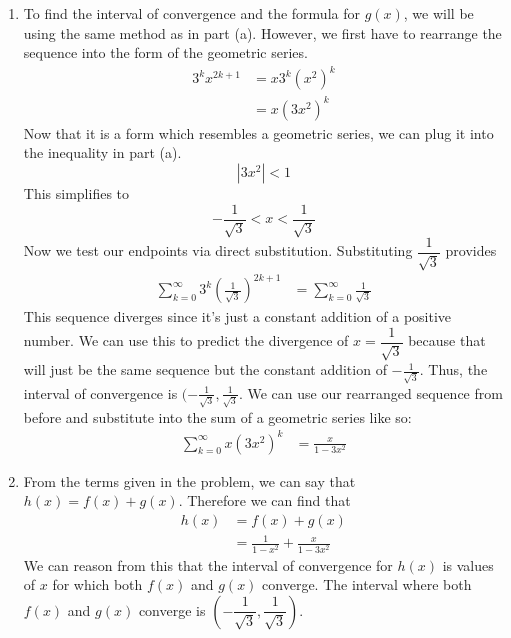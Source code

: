 \documentclass{article}
\begin{document}
\begin{enumerate}[label=\textbf{(13.\arabic*)}]
\begin{enumerate}
\item To find the interval of convergence and the formula for $g(x)$, we will be using the  same method as in part (a). However, we first have to rearrange the sequence into the form of the geometric series.
\begin{align*}
3^kx^{2k+1} &= x3^k\left(x^2\right)^k\\
&= x\left(3x^2\right)^k
\end{align*}
Now that it is a form which resembles a geometric series, we can plug it into the inequality in part (a).
\[\left|3x^2\right|<1\]
This simplifies to
\[-\frac{1}{\sqrt{3}}<x<\frac{1}{\sqrt{3}}\]
Now we test our endpoints via direct substitution. Substituting $\dfrac{1}{\sqrt{3}}$ provides 
\begin{align*}
\sum_{k=0}^\infty 3^k{\left(\frac{1}{\sqrt{3}}\right)}^{2k+1} &= \sum_{k=0}^\infty \frac{1}{\sqrt{3}}
\end{align*}
This sequence diverges since it's just a constant addition of a positive number. We can use this to predict the divergence of $x=\dfrac{1}{\sqrt{3}}$ because that will just be the same sequence but the constant addition of $-\frac{1}{\sqrt{3}}$. Thus, the interval of convergence is $(-\frac{1}{\sqrt{3}},\frac{1}{\sqrt{3}}$. We can use our rearranged sequence from before and substitute into the sum of a geometric series like so:
\begin{align*}
\sum_{k=0}^\infty x\left(3x^2\right)^k &= \frac{x}{1-3x^2}
\end{align*}
\item From the terms given in the problem, we can say that $h(x)=f(x)+g(x)$. Therefore we can find that 
\begin{align*}
h(x) &= f(x)+g(x)\\
&= \frac{1}{1-x^2}+\frac{x}{1-3x^2}
\end{align*} 
We can reason from this that the interval of convergence for $h(x)$ is values of $x$ for which both $f(x)$ and $g(x)$ converge. The interval where both $f(x)$ and $g(x)$ converge is $\left(-\dfrac{1}{\sqrt{3}},\dfrac{1}{\sqrt{3}}\right)$.
\end{enumerate}


\newpage



\end{enumerate}
\end{document}
